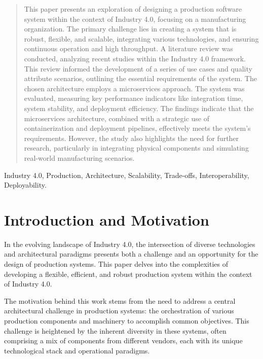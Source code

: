 \documentclass[conference]{IEEEtran}
\begin{document}
\maketitle
\IEEEpubidadjcol
\begin{abstract}
This paper presents an exploration of designing a production software system within the context of Industry 4.0, focusing on a manufacturing organization. The primary challenge lies in creating a system that is robust, flexible, and scalable, integrating various technologies, and ensuring continuous operation and high throughput. 
A literature review was conducted, analyzing recent studies within the Industry 4.0 framework. This review informed the development of a series of use cases and quality attribute scenarios, outlining the essential requirements of the system. The chosen architecture employs a microservices approach.
The system was evaluated, measuring key performance indicators like integration time, system stability, and deployment efficiency. The findings indicate that the microservices architecture, combined with a strategic use of containerization and deployment pipelines, effectively meets the system's requirements. However, the study also highlights the need for further research, particularly in integrating physical components and simulating real-world manufacturing scenarios.


\end{abstract}

\begin{IEEEkeywords}
Industry 4.0, Production, Architecture, Scalability, Trade-offs, Interoperability, Deployability.
\end{IEEEkeywords}

\section{Introduction and Motivation}
In the evolving landscape of Industry 4.0, the intersection of diverse technologies and architectural paradigms presents both a challenge and an opportunity for the design of production systems. This paper delves into the complexities of developing a flexible, efficient, and robust production system within the context of Industry 4.0. 

The motivation behind this work stems from the need to address a central architectural challenge in production systems: the orchestration of various production components and machinery to accomplish common objectives. This challenge is heightened by the inherent diversity in these systems, often comprising a mix of components from different vendors, each with its unique technological stack and operational paradigms. 
\end{document}
